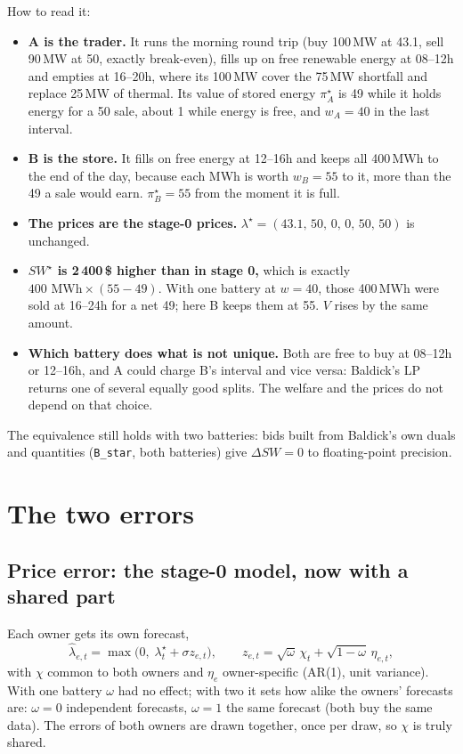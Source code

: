 \documentclass[10pt,a4paper]{article}
\newcommand{\code}[1]{\texttt{#1}}
\newcommand{\lamstar}{\lambda^{\star}}
\newcommand{\lamhat}{\hat\lambda}
\begin{document}
How to read it:
\begin{itemize}
  \item \textbf{A is the trader.} It runs the morning round trip (buy 100\,MW at 43.1, sell 90\,MW at 50,
    exactly break-even), fills up on free renewable energy at 08--12h and empties at 16--20h, where its 100\,MW cover
    the 75\,MW shortfall and replace 25\,MW of thermal. Its value of stored energy $\pi^\star_A$ is 49 while it holds
    energy for a 50 sale, about 1 while energy is free, and $w_A=40$ in the last interval.
  \item \textbf{B is the store.} It fills on free energy at 12--16h and keeps all 400\,MWh to the end of the
    day, because each MWh is worth $w_B=55$ to it, more than the 49 a sale would earn. $\pi^\star_B=55$ from
    the moment it is full.
  \item \textbf{The prices are the stage-0 prices.} $\lamstar=(43.1,\,50,\,0,\,0,\,50,\,50)$ is unchanged.
  \item \textbf{$SW^\star$ is 2\,400\,\$ higher than in stage 0,} which is exactly $400\text{ MWh}\times
    (55-49)$. With one battery at $w=40$, those 400\,MWh were sold at 16--24h for a net 49; here B keeps them
    at 55. $V$ rises by the same amount.
  \item \textbf{Which battery does what is not unique.} Both are free to buy at 08--12h or 12--16h, and A
    could charge B's interval and vice versa: Baldick's LP returns one of several equally good splits. The
    welfare and the prices do not depend on that choice.
\end{itemize}
The equivalence still holds with two batteries: bids built from Baldick's own duals and quantities
(\code{B\_star}, both batteries) give $\Delta SW=0$ to floating-point precision.

\section{The two errors}
\subsection{Price error: the stage-0 model, now with a shared part}
Each owner gets its own forecast,
\[
\lamhat_{e,t}=\max\!\big(0,\;\lamstar_t+\sigma z_{e,t}\big),\qquad
z_{e,t}=\sqrt{\omega}\,\chi_t+\sqrt{1-\omega}\,\eta_{e,t},
\]
with $\chi$ common to both owners and $\eta_e$ owner-specific (AR(1), unit variance). With one battery $\omega$
had no effect; with two it sets how alike the owners' forecasts are: $\omega=0$ independent forecasts,
$\omega=1$ the same forecast (both buy the same data). The errors of both owners are drawn together, once per
draw, so $\chi$ is truly shared.
\end{document}
